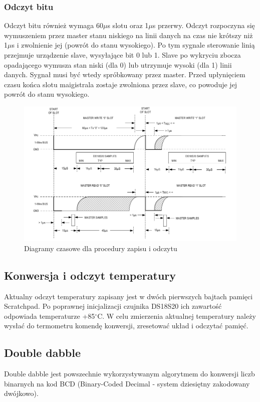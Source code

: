 \documentclass[a4paper]{article}
\begin{document}
\subsubsection{Odczyt bitu}
Odczyt bitu również wymaga 60$\mu$s slotu oraz 1$\mu$s przerwy. Odczyt rozpoczyna się wymuszeniem przez master stanu niskiego na linii danych na czas nie krótszy niż 1$\mu$s i zwolnienie jej (powrót do stanu wysokiego). Po tym sygnale sterowanie linią przejmuje urządzenie slave, wysyłające bit 0 lub 1. Slave po wykryciu zbocza opadającego wymusza stan niski (dla 0) lub utrzymuje  wysoki (dla 1) linii danych. Sygnał musi być wtedy spróbkowany przez master. Przed upłynięciem czasu końca slotu maigistrala zostaje zwolniona przez slave, co powoduje jej powrót do stanu wysokiego.

\begin{figure}[!h]
\begin{center}
\includegraphics[width=14cm]{graphics/slots.png}
\end{center}
\caption{Diagramy czasowe dla procedury zapisu i odczytu}
\label{slotsitming}
\end{figure}

\subsection{Konwersja i odczyt temperatury}
Aktualny odczyt temperatury zapisany jest w dwóch pierwszych bajtach pamięci Scratchpad. Po poprawnej inicjalizacji czujnika DS18S20 ich zawartość odpowiada temperaturze +85$^\circ$C. W celu zmierzenia aktualnej temperatury należy wysłać do termometru komendę konwersji, zresetować układ i odczytać pamięć.

\subsection{Double dabble}
Double dabble jest powszechnie wykorzystywanym algorytmem do konwersji liczb binarnych na kod BCD (Binary-Coded Decimal - system dziesiętny zakodowany dwójkowo). 
\end{document}
